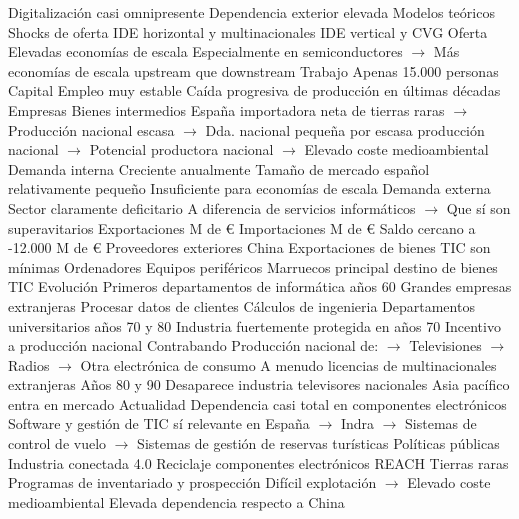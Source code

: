 \documentclass{nuevotema}
\begin{document}
\begin{esquemal}
				\4[] Digitalización casi omnipresente
				\4[] Dependencia exterior elevada
			\3 Modelos teóricos
				\4 Shocks de oferta
				\4 IDE horizontal y multinacionales
				\4 IDE vertical y CVG
			\3 Oferta
				\4 Elevadas economías de escala
				\4[] Especialmente en semiconductores
				\4[] $\to$ Más economías de escala upstream que downstream
				\4 Trabajo
				\4[] Apenas 15.000 personas
				\4 Capital
				\4[] Empleo muy estable
				\4[] Caída progresiva de producción en últimas décadas
				\4 Empresas
				\4 Bienes intermedios
				\4[] España importadora neta de tierras raras
				\4[] $\to$ Producción nacional escasa
				\4[] $\to$ Dda. nacional pequeña por escasa producción nacional
				\4[] $\to$ Potencial productora nacional
				\4[] $\to$ Elevado coste medioambiental
			\3 Demanda interna
				\4 Creciente anualmente
				\4 Tamaño de mercado español relativamente pequeño
				\4[] Insuficiente para economías de escala
			\3 Demanda externa
				\4 Sector claramente deficitario
				\4[] A diferencia de servicios informáticos
				\4[] $\to$ Que sí son superavitarios
				\4 Exportaciones
				\4[] 3.500 M de €
				\4 Importaciones
				\4[] 15.000 M de €
				\4[$\then$] Saldo cercano a -12.000 M de €
				\4 Proveedores exteriores
				\4[] China
				\4 Exportaciones de bienes TIC son mínimas
				\4[] Ordenadores
				\4[] Equipos periféricos
				\4 Marruecos principal destino de bienes TIC
			\3 Evolución
				\4 Primeros departamentos de informática años 60
				\4[] Grandes empresas extranjeras
				\4[] Procesar datos de clientes
				\4[] Cálculos de ingenieria
				\4 Departamentos universitarios años 70 y 80
				\4 Industria fuertemente protegida en años 70
				\4[] Incentivo a producción nacional
				\4[] Contrabando
				\4[] Producción nacional de:
				\4[] $\to$ Televisiones
				\4[] $\to$ Radios
				\4[] $\to$ Otra electrónica de consumo
				\4[] A menudo licencias de multinacionales extranjeras
				\4 Años 80 y 90
				\4[] Desaparece industria televisores nacionales
				\4[] Asia pacífico entra en mercado
				\4 Actualidad
				\4[] Dependencia casi total en componentes electrónicos
				\4[] Software y gestión de TIC sí relevante en España
				\4[] $\to$ Indra
				\4[] $\to$ Sistemas de control de vuelo
				\4[] $\to$ Sistemas de gestión de reservas turísticas
			\3 Políticas públicas
				\4 Industria conectada 4.0
				\4 Reciclaje componentes electrónicos
				\4 REACH
				\4 Tierras raras
				\4[] Programas de inventariado y prospección
				\4[] Difícil explotación
				\4[] $\to$ Elevado coste medioambiental
				\4[] Elevada dependencia respecto a China

\end{esquemal}
\end{document}

